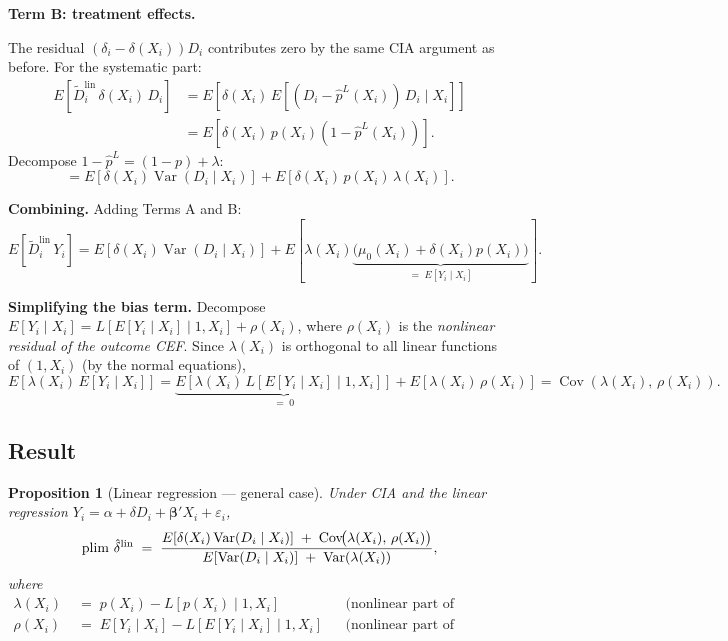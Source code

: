 \documentclass[11pt]{article}
\newtheorem{proposition}[theorem]{Proposition}
\theoremstyle{remark}
\begin{document}
\medskip\noindent\textbf{Term B: treatment effects.}

The residual $(\delta_i-\delta(X_i))D_i$ contributes zero by the same CIA argument
as before.  For the systematic part:
\begin{align*}
  E[\tilde D_i^{\mathrm{lin}}\,\delta(X_i)\,D_i]
  &= E\!\left[\delta(X_i)\,E[(D_i-\hat p^L(X_i))\,D_i\mid X_i]\right] \\
  &= E\!\left[\delta(X_i)\,p(X_i)(1-\hat p^L(X_i))\right].
\end{align*}
Decompose $1-\hat p^L = (1-p)+\lambda$:
\[
  = E\!\left[\delta(X_i)\operatorname{Var}(D_i\mid X_i)\right]
    + E\!\left[\delta(X_i)\,p(X_i)\,\lambda(X_i)\right].
\]

\medskip\noindent\textbf{Combining.}  Adding Terms A and B:
\[
  E[\tilde D_i^{\mathrm{lin}}\,Y_i]
  = E\!\left[\delta(X_i)\operatorname{Var}(D_i\mid X_i)\right]
  + E\!\left[\lambda(X_i)\!\underbrace{\bigl(\mu_0(X_i)+\delta(X_i)p(X_i)\bigr)}_{
    =\;E[Y_i\mid X_i]}\right].
\]

\medskip\noindent\textbf{Simplifying the bias term.}
Decompose $E[Y_i\mid X_i] = L[E[Y_i\mid X_i]\mid 1,X_i] + \rho(X_i)$, where
$\rho(X_i)$ is the \emph{nonlinear residual of the outcome CEF}.  Since $\lambda(X_i)$
is orthogonal to all linear functions of $(1,X_i)$ (by the normal equations),
\[
  E[\lambda(X_i)\,E[Y_i\mid X_i]]
  = \underbrace{E[\lambda(X_i)\,L[E[Y_i\mid X_i]\mid 1,X_i]]}_{=\;0}
  + E[\lambda(X_i)\,\rho(X_i)]
  = \operatorname{Cov}(\lambda(X_i),\,\rho(X_i)).
\]

\subsection{Result}

\begin{proposition}[Linear regression --- general case]\label{prop:lin}
Under CIA and the linear regression $Y_i = \alpha + \delta D_i + \bm\beta'X_i +
\varepsilon_i$,
\begin{equation}\label{eq:main}
  \operatorname{plim}\,\hat\delta^{\mathrm{lin}}
  \;=\;
  \frac{%
    E\!\left[\delta(X_i)\operatorname{Var}(D_i\mid X_i)\right]
    \;+\;
    \operatorname{Cov}\!\bigl(\lambda(X_i),\,\rho(X_i)\bigr)
  }{%
    E\!\left[\operatorname{Var}(D_i\mid X_i)\right]
    \;+\;
    \operatorname{Var}(\lambda(X_i))
  },
\end{equation}
where
\begin{align*}
  \lambda(X_i) &\;=\; p(X_i) - L[p(X_i)\mid 1,X_i]
    &&\text{(nonlinear part of propensity score),}\\
  \rho(X_i)   &\;=\; E[Y_i\mid X_i] - L[E[Y_i\mid X_i]\mid 1,X_i]
    &&\text{(nonlinear part of outcome CEF).}
\end{align*}
\end{proposition}
\end{document}
